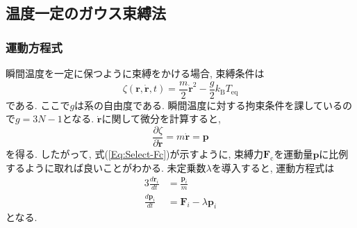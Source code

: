 \subsection{温度一定のガウス束縛法}
\subsubsection{運動方程式}

瞬間温度を一定に保つように束縛をかける場合, 束縛条件は
\begin{equation}
    \zeta(\bm{r}, \dot{\bm{r}}, t)
    =
    \frac{m}{2}\dot{\bm{r}}^{2}
    -
    \frac{g}{2} k_{\mathrm{B}} T_{\mathrm{eq}}
\end{equation}
である.
ここで$g$は系の自由度である.
瞬間温度に対する拘束条件を課しているので$g = 3N - 1$となる.
$\dot{\bm{r}}$に関して微分を計算すると,
\begin{equation}
    \frac{\partial \zeta}{\partial \dot{\bm{r}}}
    =
    m \dot{\bm{r}}
    =
    \bm{p}
\end{equation}
を得る.
したがって, 式(\ref{Eq:Select-Fc})が示すように, 束縛力$\bm{F}_{\mathrm{c}}$を運動量$\bm{p}$に比例するように取れば良いことがわかる.
未定乗数$\lambda$を導入すると, 運動方程式は
\begin{alignat}{3}
    \frac{d \bm{r}_{i}}{dt}
    &=
    \frac{\bm{p}_{i}}{m}
    \label{Eq:EoM-Gauss-Constant-Temperature1}
    \\
    \frac{d \bm{p}_{i}}{dt}
    &=
    \bm{F}_{i} - \lambda \bm{p}_{i}
    \label{Eq:EoM-Gauss-Constant-Temperature2}
\end{alignat}
となる.


